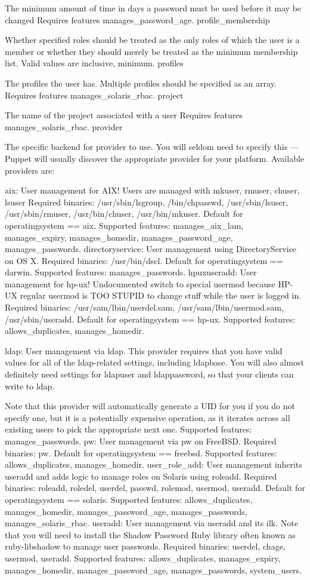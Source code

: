 The minimum amount of time in days a password must be used before it may be changed Requires features manages_password_age.
profile_membership

Whether specified roles should be treated as the only roles of which the user is a member or whether they should merely be treated as the minimum membership list. Valid values are inclusive, minimum.
profiles

The profiles the user has. Multiple profiles should be specified as an array. Requires features manages_solaris_rbac.
project

The name of the project associated with a user Requires features manages_solaris_rbac.
provider

The specific backend for provider to use. You will seldom need to specify this — Puppet will usually discover the appropriate provider for your platform. Available providers are:

    aix: User management for AIX! Users are managed with mkuser, rmuser, chuser, lsuser Required binaries: /usr/sbin/lsgroup, /bin/chpasswd, /usr/sbin/lsuser, /usr/sbin/rmuser, /usr/bin/chuser, /usr/bin/mkuser. Default for operatingsystem == aix. Supported features: manages_aix_lam, manages_expiry, manages_homedir, manages_password_age, manages_passwords.
    directoryservice: User management using DirectoryService on OS X. Required binaries: /usr/bin/dscl. Default for operatingsystem == darwin. Supported features: manages_passwords.
    hpuxuseradd: User management for hp-ux! Undocumented switch to special usermod because HP-UX regular usermod is TOO STUPID to change stuff while the user is logged in. Required binaries: /usr/sam/lbin/userdel.sam, /usr/sam/lbin/usermod.sam, /usr/sbin/useradd. Default for operatingsystem == hp-ux. Supported features: allows_duplicates, manages_homedir.

    ldap: User management via ldap. This provider requires that you have valid values for all of the ldap-related settings, including ldapbase. You will also almost definitely need settings for ldapuser and ldappassword, so that your clients can write to ldap.

    Note that this provider will automatically generate a UID for you if you do not specify one, but it is a potentially expensive operation, as it iterates across all existing users to pick the appropriate next one. Supported features: manages_passwords.
    pw: User management via pw on FreeBSD. Required binaries: pw. Default for operatingsystem == freebsd. Supported features: allows_duplicates, manages_homedir.
    user_role_add: User management inherits useradd and adds logic to manage roles on Solaris using roleadd. Required binaries: roleadd, roledel, userdel, passwd, rolemod, usermod, useradd. Default for operatingsystem == solaris. Supported features: allows_duplicates, manages_homedir, manages_password_age, manages_passwords, manages_solaris_rbac.
    useradd: User management via useradd and its ilk. Note that you will need to install the Shadow Password Ruby library often known as ruby-libshadow to manage user passwords. Required binaries: userdel, chage, usermod, useradd. Supported features: allows_duplicates, manages_expiry, manages_homedir, manages_password_age, manages_passwords, system_users.

